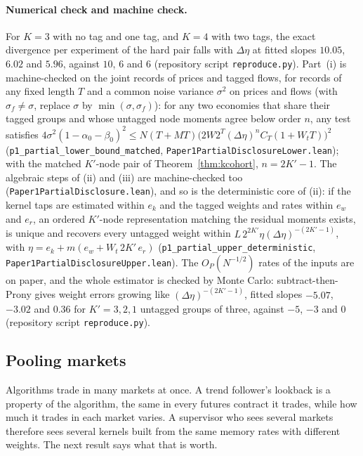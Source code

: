 \documentclass[12pt]{article}
\theoremstyle{definition}
\theoremstyle{remark}
\begin{document}
\paragraph{Numerical check and machine check.} For $K=3$ with no tag and one tag, and $K=4$ with two tags, the exact divergence per experiment of the hard pair falls with $\Delta\eta$ at fitted slopes $10.05$, $6.02$ and $5.96$, against $10$, $6$ and $6$ (repository script \nolinkurl{reproduce.py}). Part~(i) is machine-checked on the joint records of prices and tagged flows, for records of any fixed length $T$ and a common noise variance $\sigma^2$ on prices and flows (with $\sigma_f\ne\sigma$, replace $\sigma$ by $\min(\sigma,\sigma_f)$): for any two economies that share their tagged groups and whose untagged node moments agree below order $n$, any test satisfies $4\sigma^2(1-\alpha_0-\beta_0)^2\le N(T+MT)\bigl(2W2^T(\Delta\eta)^nC_T(1+W_tT)\bigr)^2$ (\texttt{p1\_partial\_lower\_bound\_matched}, \nolinkurl{Paper1PartialDisclosureLower.lean}); with the matched $K'$-node pair of Theorem~\ref{thm:kcohort}, $n=2K'-1$. The algebraic steps of (ii) and (iii) are machine-checked too (\nolinkurl{Paper1PartialDisclosure.lean}), and so is the deterministic core of (ii): if the kernel taps are estimated within $e_k$ and the tagged weights and rates within $e_w$ and $e_r$, an ordered $K'$-node representation matching the residual moments exists, is unique and recovers every untagged weight within $L\,2^{2K'}\eta(\Delta\eta)^{-(2K'-1)}$, with $\eta=e_k+m(e_w+W_t\,2K'\,e_r)$ (\texttt{p1\_partial\_upper\_deterministic}, \nolinkurl{Paper1PartialDisclosureUpper.lean}). The $O_P(N^{-1/2})$ rates of the inputs are on paper, and the whole estimator is checked by Monte Carlo: subtract-then-Prony gives weight errors growing like $(\Delta\eta)^{-(2K'-1)}$, fitted slopes $-5.07$, $-3.02$ and $0.36$ for $K'=3,2,1$ untagged groups of three, against $-5$, $-3$ and $0$ (repository script \nolinkurl{reproduce.py}).

\subsection{Pooling markets}\label{sec:pool}

Algorithms trade in many markets at once. A trend follower's lookback is a property of the algorithm, the same in every futures contract it trades, while how much it trades in each market varies. A supervisor who sees several markets therefore sees several kernels built from the same memory rates with different weights. The next result says what that is worth.
\end{document}
